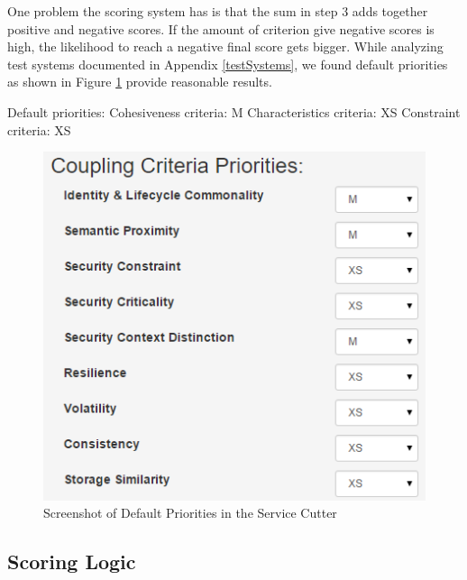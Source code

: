 \begin{minipage}[t]{0.5\textwidth}
\setlength{\parskip}{5pt plus 0.1pt}

One problem the scoring system has is that the sum in step 3 adds together positive and negative scores. If the amount of criterion give negative scores is high, the likelihood to reach a negative final score gets bigger. While analyzing test systems documented in Appendix \ref{testSystems}, we found default priorities as shown in Figure \ref{fig:priorities} provide reasonable results.


Default priorities: \newline
Cohesiveness criteria: M\newline
Characteristics criteria: XS\newline 
Constraint criteria: XS\newline

\end{minipage}
\begin{minipage}[t]{0.6\textwidth}
	\begin{figure}[H]
		\begin{center}
			\includegraphics[scale=0.5]{images/priorities.png}
			\caption{Screenshot of Default Priorities in the Service Cutter}
			\label{fig:priorities}
		\end{center}
	\end{figure}
\end{minipage}

\subsection{Scoring Logic}

